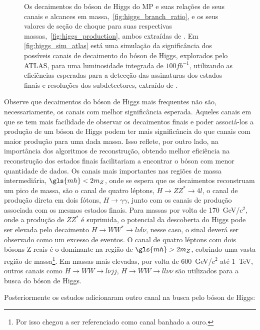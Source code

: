 \begin{figure}[ht!]
\begin{center}
{        }
    \end{center}
\caption[Simulação da significância dos canais de decaimento do bóson
de Higgs explorados pelos ATLAS, as relações de seus canais e alcances em massa,
e a seção de choque do mesmo.]
{Os decaimentos do bóson de Higgs do MP e suas relações de
seus canais e alcances em massa,~\ref{fig:higgs_branch_ratio}, e os seus valores de seção de choque para suas
respectivas massas,~\ref{fig:higgs_production}, ambos extraídas de \cite{lhc_higgs_group}. 
Em \ref{fig:higgs_sim_atlas} está uma simulação da significância dos possíveis canais de decaimento do
bóson de Higgs, explorados pelo ATLAS, para uma luminosidade integrada de
$100fb^{-1}$, utilizando as eficiências esperadas para a detecção das
assinaturas dos estados finais e resoluções dos subdetectores, extraído de
\cite{ATLAS_TDR2}.}
\end{figure}

Observe que decaimentos do bóson de Higgs mais frequentes não são,
necessariamente, os canais com melhor significância esperada. Aqueles canais em
que se tem mais facilidade de observar os decaimentos finais e poder associá-los
a produção de um bóson de Higgs podem ter mais significância do que canais com
maior produção para uma dada massa. Isso reflete, por outro lado, na importância
dos algoritmos de reconstrução, obtendo melhor eficiência na reconstrução dos
estados finais facilitariam a encontrar o bóson com menor quantidade de dados.
Os canais mais importantes nas regiões de massa intermediária, $\gls{mh}<2m_Z$,
onde se espera que os decaimentos reconstruam um pico de massa, são 
o canal de quatro léptons, $H\rightarrow ZZ^* \rightarrow 4l$, o canal de
produção direta em dois fótons, $H\rightarrow \gamma\gamma$, junto com os
canais de produção associada com os mesmos estados finais. Para massas por volta
de 170~GeV/$c^2$, onde a produção de $ZZ^*$ é suprimida, o potencial da descoberta do
Higgs pode ser elevada pelo decaimento $H\rightarrow WW^*\rightarrow l\nu l\nu$,
nesse caso, o sinal deverá ser observado como um excesso de eventos. O canal de
quatro léptons com dois bósons Z reais é o dominante na região de
$\gls{mh}>2m_Z$, cobrindo uma vasta região de massa\footnote{Por isso chegou a
ser referenciado como canal banhado a ouro.}. Em massas mais elevadas, por volta 
de 600~GeV/$c^2$ até 1~TeV, outros canais como $H\rightarrow WW\rightarrow l\nu jj$, $H\rightarrow
WW\rightarrow ll\nu\nu$ são utilizados para a busca do bóson de Higgs.

Posteriormente os estudos \cite{atlas_tautau,atlas_tautau2} adicionaram outro
canal na busca pelo bóson de Higgs:

